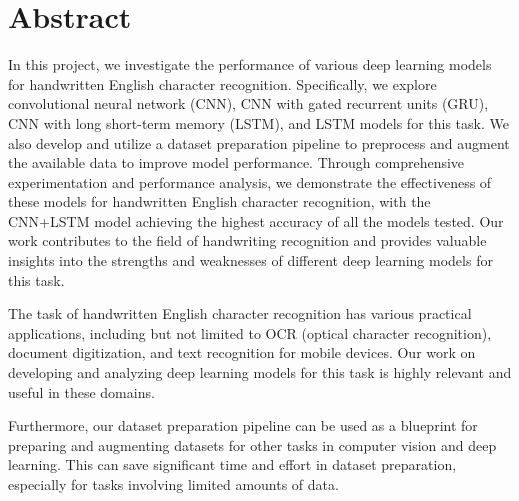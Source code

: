 \newpage
\chapter*{\centering Abstract}
{

 In this project, we investigate the performance of various deep learning models for handwritten English character recognition. Specifically, we explore convolutional neural network (CNN), CNN with gated recurrent units (GRU), CNN with long short-term memory (LSTM), and LSTM models for this task. We also develop and utilize a dataset preparation pipeline to preprocess and augment the available data to improve model performance. Through comprehensive experimentation and performance analysis, we demonstrate the effectiveness of these models for handwritten English character recognition, with the CNN+LSTM model achieving the highest accuracy of all the models tested. Our work contributes to the field of handwriting recognition and provides valuable insights into the strengths and weaknesses of different deep learning models for this task.

The task of handwritten English character recognition has various practical applications, including but not limited to OCR (optical character recognition), document digitization, and text recognition for mobile devices. Our work on developing and analyzing deep learning models for this task is highly relevant and useful in these domains.

Furthermore, our dataset preparation pipeline can be used as a blueprint for preparing and augmenting datasets for other tasks in computer vision and deep learning. This can save significant time and effort in dataset preparation, especially for tasks involving limited amounts of data.



}

 